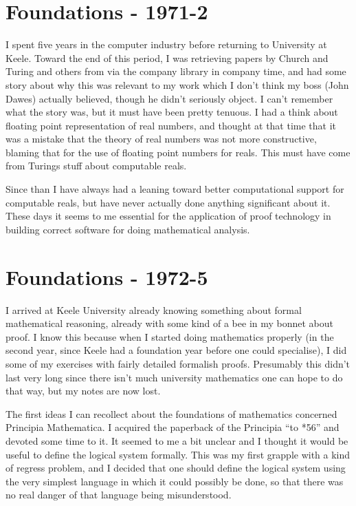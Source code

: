 \documentclass[10pt,titlepage]{book}
\begin{document}
\section{Foundations - 1971-2}

I spent five years in the computer industry before returning to University at Keele.
Toward the end of this period, I was retrieving papers by Church and Turing and others from via the company library in company time, and had some story about why this was relevant to my work which I don't think my boss (John Dawes) actually believed, though he didn't seriously object.
I can't remember what the story was, but it must have been pretty tenuous.
I had a think about floating point representation of real numbers, and thought at that time that it was a mistake that the theory of real numbers was not more constructive, blaming that for the use of floating point numbers for reals.
This must have come from Turings stuff about computable reals.

Since than I have always had a leaning toward better computational support for computable reals, but have never actually done anything significant about it.
These days it seems to me essential for the application of proof technology in building correct software for doing mathematical analysis.

\section{Foundations - 1972-5}

I arrived at Keele University already knowing something about formal mathematical reasoning, already with some kind of a bee in my bonnet about proof.
I know this because when I started doing mathematics properly (in the second year, since Keele had a foundation year before one could specialise), I did some of my exercises with fairly detailed formalish proofs.
Presumably this didn't last very long since there isn't much university mathematics one can hope to do that way, but my notes are now lost.

The first ideas I can recollect about the foundations of mathematics concerned Principia Mathematica.
I acquired the paperback of the Principia ``to *56'' and devoted some time to it.
It seemed to me a bit unclear and I thought it would be useful to define the logical system formally.
This was my first grapple with a kind of regress problem, and I decided that one should define the logical system using the very simplest language in which it could possibly be done, so that there was no real danger of that language being misunderstood.
\end{document}

